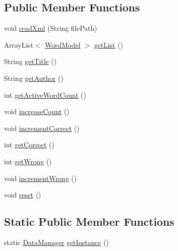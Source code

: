 \subsection*{Public Member Functions}
\begin{DoxyCompactItemize}
\item 
void \hyperlink{classorg_1_1buildmlearn_1_1toolkit_1_1learnspelling_1_1DataManager_a3fd8a313e9ef9dab76725009a3697e0c}{read\-Xml} (String file\-Path)
\item 
Array\-List$<$ \hyperlink{classorg_1_1buildmlearn_1_1toolkit_1_1learnspelling_1_1WordModel}{Word\-Model} $>$ \hyperlink{classorg_1_1buildmlearn_1_1toolkit_1_1learnspelling_1_1DataManager_ae9636c402574a2deaaf3ef9b8a7a14a4}{get\-List} ()
\item 
String \hyperlink{classorg_1_1buildmlearn_1_1toolkit_1_1learnspelling_1_1DataManager_a8b1872c45bc78135989aa0ee7af83f73}{get\-Title} ()
\item 
String \hyperlink{classorg_1_1buildmlearn_1_1toolkit_1_1learnspelling_1_1DataManager_a7cc32c4c6be5e5d70045d0b10f1a2850}{get\-Author} ()
\item 
int \hyperlink{classorg_1_1buildmlearn_1_1toolkit_1_1learnspelling_1_1DataManager_a42a06c0c3ebd9ce4e90d7db5efda93b0}{get\-Active\-Word\-Count} ()
\item 
void \hyperlink{classorg_1_1buildmlearn_1_1toolkit_1_1learnspelling_1_1DataManager_acb93ba29d288da3139c448491c2cb545}{increase\-Count} ()
\item 
void \hyperlink{classorg_1_1buildmlearn_1_1toolkit_1_1learnspelling_1_1DataManager_a4d9d8bdfb3013ee7f60999cccb4c0708}{increment\-Correct} ()
\item 
int \hyperlink{classorg_1_1buildmlearn_1_1toolkit_1_1learnspelling_1_1DataManager_a5544f492cfdf9c117412ac232b390918}{get\-Correct} ()
\item 
int \hyperlink{classorg_1_1buildmlearn_1_1toolkit_1_1learnspelling_1_1DataManager_a18a0de85ba35ec8044f6240ec9f53c7f}{get\-Wrong} ()
\item 
void \hyperlink{classorg_1_1buildmlearn_1_1toolkit_1_1learnspelling_1_1DataManager_a46669a045691413b410a20149180d0a9}{increment\-Wrong} ()
\item 
void \hyperlink{classorg_1_1buildmlearn_1_1toolkit_1_1learnspelling_1_1DataManager_a563486fa47d940f3ce806b8e60f26a8e}{reset} ()
\end{DoxyCompactItemize}
\subsection*{Static Public Member Functions}
\begin{DoxyCompactItemize}
\item 
static \hyperlink{classorg_1_1buildmlearn_1_1toolkit_1_1learnspelling_1_1DataManager}{Data\-Manager} \hyperlink{classorg_1_1buildmlearn_1_1toolkit_1_1learnspelling_1_1DataManager_a7f2efbad139020fb8ec287c16b5b8ea2}{get\-Instance} ()
\end{DoxyCompactItemize}



